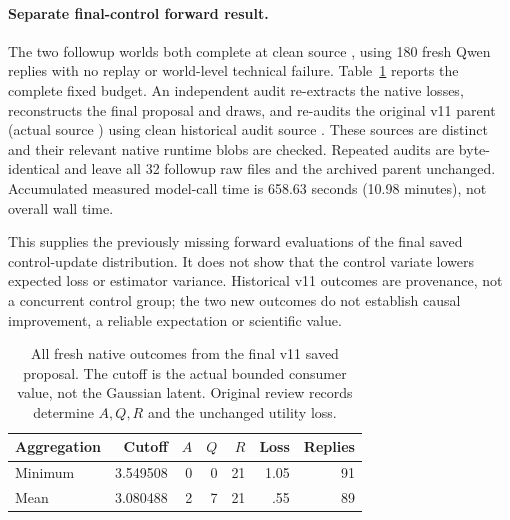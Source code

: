 \paragraph{Separate final-control forward result.}
The two followup worlds both complete at clean source , using
180 fresh Qwen replies with no replay or world-level technical failure.
Table~\ref{tab:final-control-followup-v12} reports the complete fixed budget.
An independent audit re-extracts the native losses, reconstructs the final
proposal and draws, and re-audits the original v11 parent (actual source
) using clean historical audit source . These sources
are distinct and their relevant native runtime blobs are checked.
Repeated audits are byte-identical and leave all 32 followup
raw files and the archived parent unchanged. Accumulated measured model-call
time is 658.63 seconds (10.98 minutes), not overall wall time.

This supplies the previously missing forward evaluations of the final saved
control-update distribution. It does not show that the control variate lowers
expected loss or estimator variance. Historical v11 outcomes are provenance,
not a concurrent control group; the two new outcomes do not establish causal
improvement, a reliable expectation or scientific value.

\begin{table}[t]
\centering
\caption{All fresh native outcomes from the final v11 saved proposal. The cutoff
is the actual bounded consumer value, not the Gaussian latent. Original review
records determine $A,Q,R$ and the unchanged utility loss.}
\label{tab:final-control-followup-v12}
\begin{tabular}{lrrrrrr}
\toprule
Aggregation & Cutoff & $A$ & $Q$ & $R$ & Loss & Replies \\
\midrule
Minimum & 3.549508 & 0 & 0 & 21 & 1.05 & 91 \\
Mean & 3.080488 & 2 & 7 & 21 & .55 & 89 \\
\bottomrule
\end{tabular}
\end{table}

